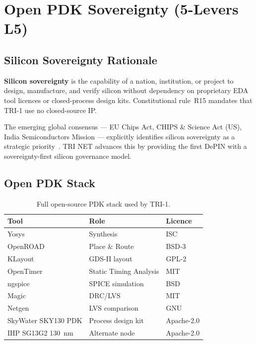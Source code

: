 
\section{Open PDK Sovereignty (5-Levers L5)}
\label{sec:flos74-sovereignty}

\subsection{Silicon Sovereignty Rationale}

\textbf{Silicon sovereignty} is the capability of a nation, institution, or
project to design, manufacture, and verify silicon without dependency on
proprietary EDA tool licences or closed-process design kits.
Constitutional rule~R15 mandates that TRI-1 use no closed-source IP.

The emerging global consensus — EU Chips Act, CHIPS \& Science Act (US), India
Semiconductors Mission — explicitly identifies silicon sovereignty as a
strategic priority~\cite{bondar2025microcredentials}.
TRI NET advances this by providing the first DePIN with a sovereignty-first
silicon governance model.

\subsection{Open PDK Stack}

\begin{table}[h]
\centering
\caption{Full open-source PDK stack used by TRI-1.}
\label{tab:open-pdk}
\begin{tabular}{lll}
\hline
Tool & Role & Licence \\
\hline
Yosys & Synthesis & ISC \\
OpenROAD & Place \& Route & BSD-3 \\
KLayout & GDS-II layout & GPL-2 \\
OpenTimer & Static Timing Analysis & MIT \\
ngspice & SPICE simulation & BSD \\
Magic & DRC/LVS & MIT \\
Netgen & LVS comparison & GNU \\
SkyWater SKY130 PDK & Process design kit & Apache-2.0 \\
IHP SG13G2 130~nm & Alternate node & Apache-2.0 \\
\hline
\end{tabular}
\end{table}

